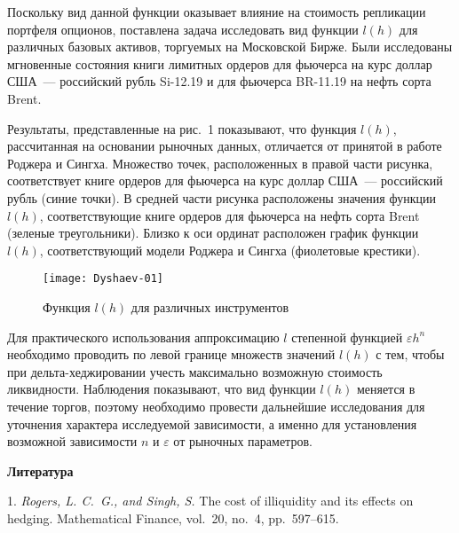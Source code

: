 Поскольку вид данной функции оказывает влияние на стоимость репликации портфеля опционов,  поставлена задача исследовать вид функции $l(h)$ для различных базовых активов, торгуемых на Московской Бирже. Были исследованы мгновенные состояния книги лимитных ордеров для фьючерса на курс доллар США~--- российский рубль Si-12.19 и для фьючерса BR-11.19 на нефть сорта Brent.

Результаты, представленные на рис.~1 показывают, что функция  $l(h)$, рассчитанная на основании рыночных данных, отличается от принятой в работе Роджера и Сингха. Множество точек, расположенных в правой части рисунка, соответствует книге ордеров для фьючерса на курс доллар США~--- российский рубль (синие точки). В средней части рисунка расположены значения функции $l(h)$, соответствующие книге ордеров для фьючерса на нефть сорта Brent (зеленые треугольники). Близко к оси ординат расположен график функции $l(h)$, соответствующий модели Роджера и Сингха (фиолетовые крестики).
\begin{figure}
	\centering
	\texttt{[image: Dyshaev-01]}
	\caption{\footnotesize Функция $l(h)$ для различных инструментов}
	\label{fig:dyshaev-01}
\end{figure}

Для практического использования аппроксимацию $l$ степенной функцией $\varepsilon h^n$ необходимо проводить по левой границе множеств значений $l(h)$ с тем, чтобы при дельта-хед\-жи\-ро\-ва\-нии учесть максимально возможную стоимость ликвидности. Наблюдения показывают, что вид функции $l(h)$ меняется в течение торгов, поэтому необходимо провести дальнейшие исследования для уточнения характера исследуемой зависимости, а именно для установления возможной зависимости  $n$ и $\varepsilon$ от  рыночных параметров.

\smallskip \centerline {\bf Литература} \nopagebreak

1. {\it Rogers, L. C.~G., and Singh, S.} The cost of illiquidity and its effects on hedging. Mathematical Finance, vol.~20, no.~4, pp.~597--615.
